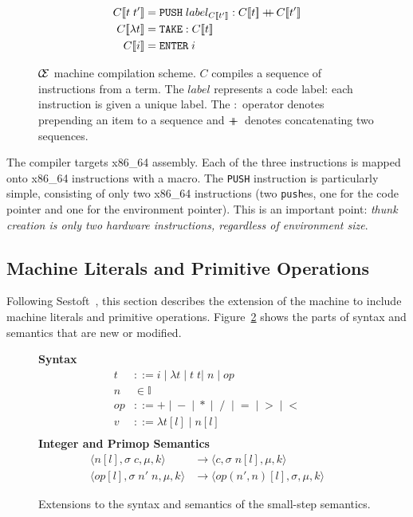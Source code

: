 \begin{figure}
\begin{align*} C[\![t \; t']\!] &= \texttt{PUSH}\;label_{C[\![t']\!]}:C[\![t]\!] \concat C[\![t']\!] \\
C[\![\lambda t]\!] &= \texttt{TAKE}:C[\![t]\!] \\
C[\![i]\!] &= \texttt{ENTER} \; i
\end{align*}
\caption{$\mathcal{\mathcal{C} \mskip -4mu \mathcal{E}}$ machine compilation scheme. $C$ compiles a sequence of
instructions from a term. The $label$ represents a code label: each instruction
is given a unique label. The $:$ operator denotes prepending an item to a
sequence and $+\!\!\!\!+\,$ denotes concatenating two sequences.}
\label{fig:cemcompile}
\end{figure}

The compiler targets x86\_64 assembly. Each of the three instructions is mapped
onto x86\_64 instructions with a macro. The \texttt{PUSH} instruction is
particularly
simple, consisting of only two x86\_64 instructions (two \texttt{push}es, one for
the code pointer and one for the environment pointer). This is an important
point: \emph{thunk creation is only two hardware instructions, regardless of
environment size}.  

\subsection{Machine Literals and Primitive Operations}

Following Sestoft~\cite{sestoft}, this section describes the extension of the
\ce machine to include machine literals and primitive operations.
Figure~\ref{fig:extsyntax} shows the parts of syntax and semantics that are new
or modified. 

\begin{figure}
\textbf{Syntax}
\begin{align*}
\tag{Term}    t &::= i \; | \; \lambda t \; | \; t \; t | \; n \; | \; op \\
\tag{Integer} n &\in \mathbb{I} \\
\tag{PrimOp} op &::= + \; | \; - \; | \; * \; | \; \; / \;\; | \; = \; | \; > \; | \; < \\
\tag{Value} v &::= \lambda t[l] \; | \; n[l] \\
\end{align*}
\textbf{Integer and Primop Semantics}
\begin{align*}
\tag{Int}
\langle n[l], \sigma \; c, \mu, k \rangle
  &\rightarrow
\langle c, \sigma \; n[l], \mu, k \rangle \\
\tag{Op} 
\langle op[l], \sigma \; n' \; n, \mu, k \rangle
  &\rightarrow
\langle op(n',n)[l], \sigma, \mu, k \rangle
\end{align*}
\caption{Extensions to the syntax and semantics of the small-step \ce semantics.}
\label{fig:extsyntax}
\end{figure}

